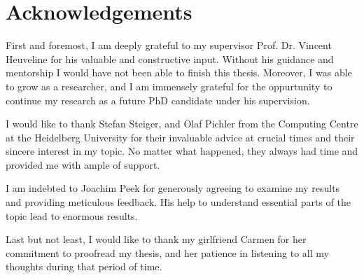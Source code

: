 \chapter*{Acknowledgements}
\thispagestyle{empty}

First and foremost, I am deeply grateful to my supervisor Prof. Dr. Vincent Heuveline for his valuable and constructive input.
Without his guidance and mentorship I would have not been able to finish this thesis.
Moreover, I was able to grow as a researcher, and I am immensely grateful for the oppurtunity to continue my research as a future PhD candidate under his supervision.

I would like to thank Stefan Steiger, and Olaf Pichler from the Computing Centre at the Heidelberg University for their invaluable advice at crucial times and their sincere interest in my topic.
No matter what happened, they always had time and provided me with ample of support.

I am indebted to Joachim Peek for generously agreeing to examine my results and providing meticulous feedback.
His help to understand essential parts of the topic lead to enormous results.

Last but not least, I would like to thank my girlfriend Carmen for her commitment to proofread my thesis, and her patience in listening to all my thoughts during that period of time.
